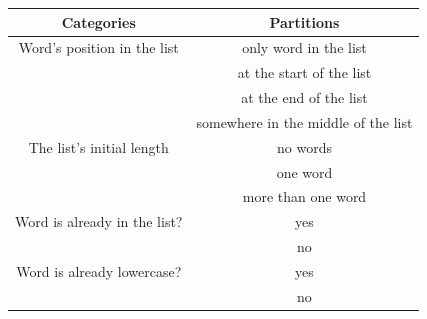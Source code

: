 \begin{center} \begin{tabular}{c|c}
    \textbf{Categories}             & \textbf{Partitions}                   \\ \hline\hline
    Word's position in the list     & only word in the list                 \\
                                    & at the start of the list              \\
                                    & at the end of the list                \\
                                    & somewhere in the middle of the list   \\ \hline
    The list's initial length       & no words                              \\
                                    & one word                              \\
                                    & more than one word                    \\ \hline
    Word is already in the list?    & yes                                   \\
                                    & no                                    \\ \hline
    Word is already lowercase?      & yes                                   \\
                                    & no
\end{tabular}\end{center}

\begin{description}
\end{description}

